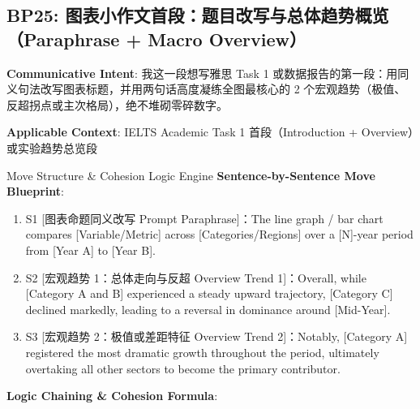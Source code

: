 \subsection{BP25: 图表小作文首段：题目改写与总体趋势概览（Paraphrase + Macro Overview）}\label{sec:bp:BP25}
\noindent\textbf{\color{AcadNavy}Communicative Intent}: 我这一段想写雅思 Task 1 或数据报告的第一段：用同义句法改写图表标题，并用两句话高度凝练全图最核心的 2 个宏观趋势（极值、反超拐点或主次格局），绝不堆砌零碎数字。\par\vspace{2pt}
\noindent\textbf{\color{AcadSlate}Applicable Context}: IELTS Academic Task 1 首段（Introduction + Overview）或实验趋势总览段\par\vspace{4pt}
\begin{ConceptBox}{Move Structure \& Cohesion Logic Engine}
\textbf{Sentence-by-Sentence Move Blueprint}:
\begin{enumerate}[label=\textbf{\color{AcadNavy}S\arabic*.}, leftmargin=2em, itemsep=2pt]
  \item S1 [图表命题同义改写 Prompt Paraphrase]：The line graph / bar chart compares [Variable/Metric] across [Categories/Regions] over a [N]-year period from [Year A] to [Year B].
  \item S2 [宏观趋势 1：总体走向与反超 Overview Trend 1]：Overall, while [Category A and B] experienced a steady upward trajectory, [Category C] declined markedly, leading to a reversal in dominance around [Mid-Year].
  \item S3 [宏观趋势 2：极值或差距特征 Overview Trend 2]：Notably, [Category A] registered the most dramatic growth throughout the period, ultimately overtaking all other sectors to become the primary contributor.
\end{enumerate}\par\vspace{4pt}
\textbf{Logic Chaining \& Cohesion Formula}:\par{}
\end{ConceptBox}
